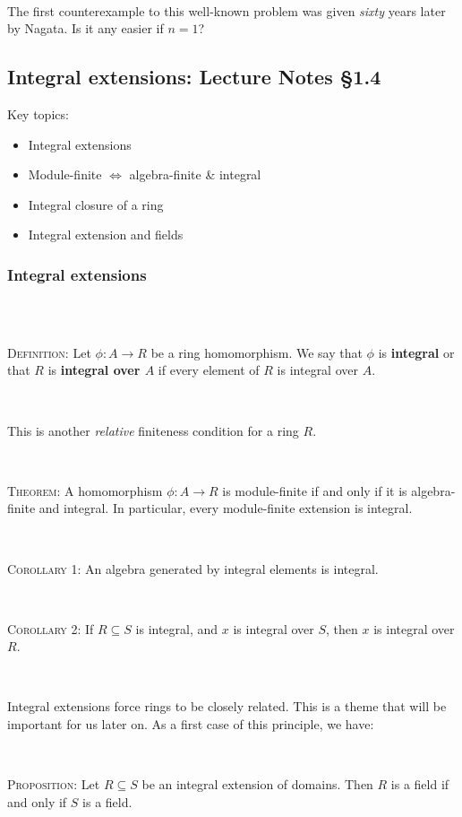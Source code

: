 \documentclass[12pt]{amsart}
\newcommand{\0}{$\phantom{.}$}
\newcommand{\1}{\mathbbm{1}}
\newcommand{\sssec}[1]{\subsubsection*{#1}}
\begin{document}
\

\noindent The first counterexample to this well-known problem was given \emph{sixty} years later by Nagata. Is it any easier if $n=1$?




\newpage
\subsection{Integral extensions: Lecture Notes \S1.4}

\begin{framed} Key topics:
\begin{itemize}
\item Integral extensions
\item Module-finite $\Longleftrightarrow$ algebra-finite \& integral
\item Integral closure of a ring
\item Integral extension and fields
\end{itemize}
\end{framed}


\sssec{Integral extensions} \0 

\

\noindent \textsc{Definition:} Let $\phi: A\to R$ be a ring homomorphism. We say that $\phi$ is \textbf{integral} or that $R$ is \textbf{integral over $A$} if every element of $R$ is integral over $A$.

\

\noindent This is another \emph{relative} finiteness condition for a ring $R$.

\

\noindent \textsc{Theorem:} A homomorphism $\phi: A \to R$ is module-finite if and only if it is algebra-finite and integral. In particular, every module-finite extension is integral.

\

\noindent \textsc{Corollary 1:} An algebra generated by integral elements is integral. 

\

\noindent \textsc{Corollary 2:} If $R\subseteq S$ is integral, and $x$ is integral over $S$, then $x$ is integral over $R$.

\

\noindent Integral extensions force rings to be closely related. This is a theme that will be important for us later on. As a first case of this principle, we have:

\

\noindent \textsc{Proposition:} Let $R\subseteq S$ be an integral extension of domains. Then $R$ is a field if and only if $S$ is a field.
\end{document}
